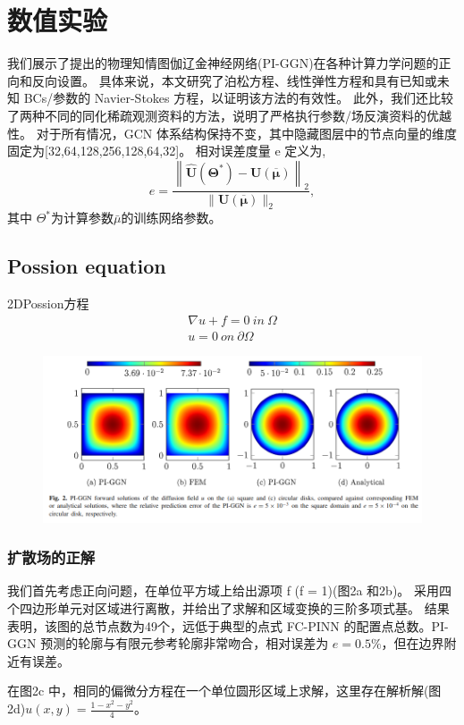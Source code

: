\section{数值实验}
我们展示了提出的物理知情图伽辽金神经网络(PI-GGN)在各种计算力学问题的正向和反向设置。
具体来说，本文研究了泊松方程、线性弹性方程和具有已知或未知 BCs/参数的 Navier-Stokes 方程，以证明该方法的有效性。
此外，我们还比较了两种不同的同化稀疏观测资料的方法，说明了严格执行参数/场反演资料的优越性。
对于所有情况，GCN 体系结构保持不变，其中隐藏图层中的节点向量的维度固定为[32,64,128,256,128,64,32]。
相对误差度量 e 定义为,
$$e=\frac{\left\|\hat{\boldsymbol{U}}\left(\boldsymbol{\Theta}^{*}\right)-\boldsymbol{U}(\overline{\boldsymbol{\mu}})\right\|_{2}}{\|\boldsymbol{U}(\overline{\boldsymbol{\mu}})\|_{2}},$$
其中 $\Theta^{*}$为计算参数$\bar{\mu} $的训练网络参数。
\subsection{Possion equation}
2DPossion方程
$$\begin{aligned}
    \nabla u + f=0\ in\ \Omega\\
    u=0\ on \ \partial \Omega
\end{aligned}$$
\begin{figure}[H]  
    \centering  
    \includegraphics[width=\textwidth]{./pics/Possion.png}  
\end{figure}
\subsubsection{扩散场的正解}
我们首先考虑正向问题，在单位平方域上给出源项 f (f = 1)(图2a 和2b)。
采用四个四边形单元对区域进行离散，并给出了求解和区域变换的三阶多项式基。
结果表明，该图的总节点数为49个，远低于典型的点式 FC-PINN 的配置点总数。PI-GGN 预测的轮廓与有限元参考轮廓非常吻合，相对误差为 $e = 0.5\%$，但在边界附近有误差。

在图2c 中，相同的偏微分方程在一个单位圆形区域上求解，这里存在解析解(图2d)$u(x,y)=\frac{1-x^2-y^2}{4}$。

